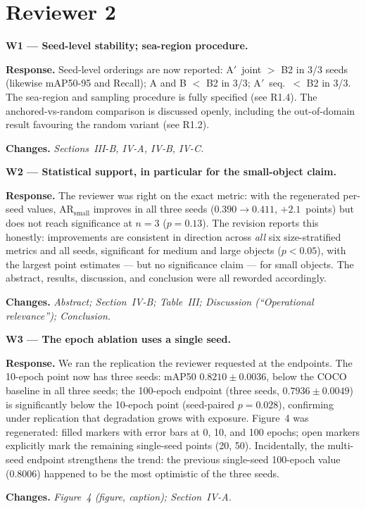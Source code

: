 \documentclass[11pt]{article}
\newcommand{\resp}[1]{\par\noindent\textbf{Response.} #1}
\newcommand{\chg}[1]{\par\noindent\textbf{Changes.} \textit{#1}}
\newcommand{\pt}[1]{\par\medskip\noindent\textbf{#1}}
\begin{document}
\section*{Reviewer 2}

\pt{W1 --- Seed-level stability; sea-region procedure.}
\resp{Seed-level orderings are now reported: A$'$~joint $>$ B2 in 3/3 seeds
(likewise mAP50-95 and Recall); A and B $<$ B2 in 3/3; A$'$~seq.\ $<$ B2 in
3/3. The sea-region and sampling procedure is fully specified (see R1.4). The
anchored-vs-random comparison is discussed openly, including the out-of-domain
result favouring the random variant (see R1.2).}
\chg{Sections~III-B, IV-A, IV-B, IV-C.}

\pt{W2 --- Statistical support, in particular for the small-object claim.}
\resp{The reviewer was right on the exact metric: with the regenerated
per-seed values, $\mathrm{AR}_\mathrm{small}$ improves in all three seeds
($0.390\rightarrow0.411$, $+2.1$~points) but does not reach significance at
$n{=}3$ ($p=0.13$). The revision reports this honestly: improvements are
consistent in direction across \emph{all} six size-stratified metrics and all
seeds, significant for medium and large objects ($p<0.05$), with the largest
point estimates --- but no significance claim --- for small objects. The
abstract, results, discussion, and conclusion were all reworded accordingly.}
\chg{Abstract; Section~IV-B; Table~III; Discussion (``Operational
relevance''); Conclusion.}

\pt{W3 --- The epoch ablation uses a single seed.}
\resp{We ran the replication the reviewer requested at the endpoints. The
10-epoch point now has three seeds: mAP50 $0.8210\pm0.0036$, below the COCO
baseline in all three seeds; the 100-epoch endpoint (three seeds,
$0.7936\pm0.0049$) is significantly below the 10-epoch point (seed-paired
$p=0.028$), confirming under replication that degradation grows with exposure.
Figure~4 was regenerated: filled markers with error bars at 0, 10, and 100
epochs; open markers explicitly mark the remaining single-seed points (20,
50). Incidentally, the multi-seed endpoint strengthens the trend: the previous
single-seed 100-epoch value (0.8006) happened to be the most optimistic of the
three seeds.}
\chg{Figure~4 (figure, caption); Section~IV-A.}
\end{document}
